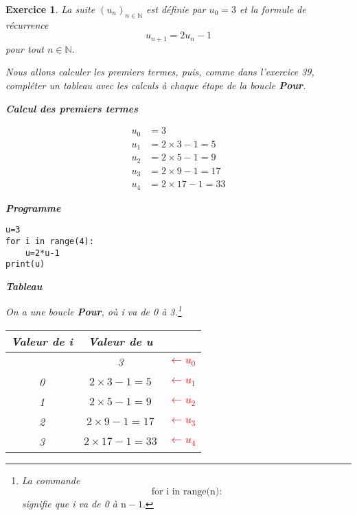 \documentclass[10pt]{article}
\newtheorem{exo}{Exercice}
\begin{document}
\begin{exo}

La suite $(u_n)_{n\in\mathbb{N}}$ est définie par $u_0=3$ et la formule de récurrence
\[u_{n+1}=2u_n-1\] pour tout $n\in\mathbb{N}.$

\medskip

Nous allons calculer les premiers termes, puis, comme dans l'exercice 39, compléter un tableau avec les calculs à chaque étape de la boucle \textbf{Pour}.


\setlength{\columnseprule}{1pt}

\begin{multicols}{3}

\begin{center}
\textbf{Calcul des premiers termes}
\end{center}

\medskip

\begin{align*}
u_0&=3\\
u_1&=2\times 3-1=5\\
u_2&=2\times 5-1=9\\
u_3&=2\times 9-1=17\\
u_4&=2\times 17-1=33
\end{align*}

\vspace*{0.cm}

\columnbreak
\begin{center}
\textbf{Programme}
\end{center}

\begin{lstlisting}
u=3
for i in range(4):
	u=2*u-1
print(u)
\end{lstlisting}



\vspace*{1.cm}


\columnbreak



\begin{center}
\textbf{Tableau}
\end{center}


On a une boucle \textbf{Pour}, où i va de 0 à 3.\footnote{La commande \[\text{for i in range(n):}\] signifie que i va de 0 à $\text{n}-1.$}

\medskip

\begin{center}


\begin{tabular}{|c|cc|} \hline
\textbf{Valeur de i}& \textbf{Valeur de u}&\\ \hline
\cellcolor{gray}& 3&\textcolor{red}{$\leftarrow {u_0}$}\\ \hline
0& $2\times 3-1=5$&\textcolor{red}{$\leftarrow {u_1}$}\\ \hline
1&$2\times 5-1=9$&\textcolor{red}{$\leftarrow {u_2}$}\\ \hline
2& $2\times 9-1=17$&\textcolor{red}{$\leftarrow {u_3}$}\\ \hline
3&$2\times 17-1=33$&\textcolor{red}{$\leftarrow {u_4}$} \\ \hline


\end{tabular}
\end{center}
\end{multicols}
\end{exo}
\end{document}
